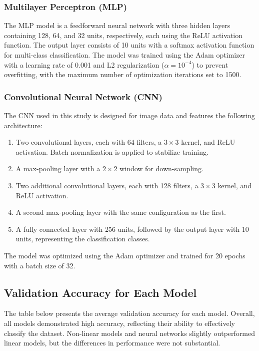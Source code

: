 \documentclass{article}
\begin{document}
\subsubsection{Multilayer Perceptron (MLP)}
The MLP model is a feedforward neural network with three hidden layers containing 128, 64, and 32 units, respectively, each using the ReLU activation function. The output layer consists of 10 units with a softmax activation function for multi-class classification. 
The model was trained using the Adam optimizer with a learning rate of 0.001 and L2 regularization ($\alpha = 10^{-4}$) to prevent overfitting, with the maximum number of optimization iterations set to 1500.

\subsubsection{Convolutional Neural Network (CNN)}
The CNN used in this study is designed for image data and features the following architecture:
\begin{enumerate}
    \item Two convolutional layers, each with 64 filters, a $3 \times 3$ kernel, and ReLU activation. Batch normalization is applied to stabilize training.
    \item A max-pooling layer with a $2 \times 2$ window for down-sampling.
    \item Two additional convolutional layers, each with 128 filters, a $3 \times 3$ kernel, and ReLU activation.
    \item A second max-pooling layer with the same configuration as the first.
    \item A fully connected layer with 256 units, followed by the output layer with 10 units, representing the classification classes.
\end{enumerate}

The model was optimized using the Adam optimizer and trained for 20 epochs with a batch size of 32.

\subsection{Validation Accuracy for Each Model}
The table below presents the average validation accuracy for each model. Overall, all models demonstrated high accuracy, reflecting their ability to effectively classify the dataset. Non-linear models and neural networks slightly outperformed linear models, but the differences in performance were not substantial.
\end{document}
